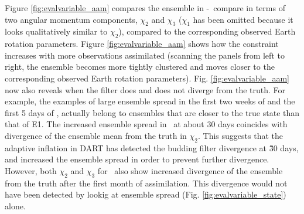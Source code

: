 Figure \ref{fig:evalvariable_aam} compares the ensemble in \WACCMNODA-\WACCMGLOBAL~compare in terms of two angular momentum components, $\chi_2$ and $\chi_3$ ($\chi_1$ has been omitted because it looks qualitatively similar to $\chi_2$),  
compared to the corresponding observed Earth rotation parameters. 
Figure  \ref{fig:evalvariable_aam} shows how the constraint increases with more observations assimilated (scanning the panels from left to right, the ensemble becomes more tightly clustered and moves closer to the corresponding observed Earth rotation parameters). 
Fig. \ref{fig:evalvariable_aam} now also reveals when the filter does and does not diverge from the truth.  
For example, the examples of large ensemble spread in the first two weeks of \WACCMTROPICS and the first 5 days of \WACCMGLOBAL, actually belong to ensembles that are closer to the true state than that of E1. 
The increased ensemble spread in \WACCMGLOBAL~at about 30 days coincides with divergence of the ensemble mean from the truth in $\chi_2$. 
This suggests that the adaptive inflation in DART has detected the budding filter divergence at \~30 days, and increased the ensemble spread in order to prevent further divergence.
However, both $\chi_2$ and $\chi_3$ for \WACCMGLOBAL~also show increased divergence of the ensemble from the truth after the first month of assimilation. 
This divergence would not have been detected by lookig at ensemble spread (Fig. \ref{fig:evalvariable_state}) alone. 
